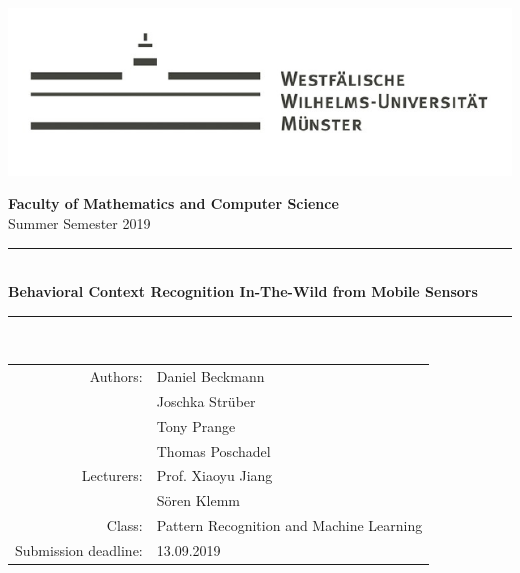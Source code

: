\documentclass[a4paper,12pt]{scrartcl}
\begin{document}
	
	
	\begin{singlespace}
		\begin{titlepage}
			\begin{center}
				
				\includegraphics[scale=0.6]{wwu}
				
				\large{\textbf{\textsf{Faculty of Mathematics and Computer Science}}\\ 
					Summer Semester 2019} \\
				\vspace{20mm}
				\rule{.8\linewidth}{1pt}\\
				\vspace{3mm}
				\LARGE\textbf{\textsf{Behavioral Context Recognition In-The-Wild from Mobile Sensors}}\\
				\rule{.8\linewidth}{1pt}\\
				
				\vfill
			\end{center}
			\begin{flushright}
				\flushright
				
				\begin{large}
					\singlespacing 		
					\begin{tabular}{rl}
						
						Authors: & Daniel Beckmann \\ & Joschka Strüber \\& Tony Prange \\& Thomas Poschadel \\
						\midrule
						Lecturers: & Prof. Xiaoyu Jiang \\
						& Sören Klemm \\
						Class:& Pattern Recognition and Machine Learning \\
						Submission deadline: & 13.09.2019
						
					\end{tabular}
				\end{large}	
			\end{flushright}
			

\end{titlepage}
\end{singlespace}
\end{document}
